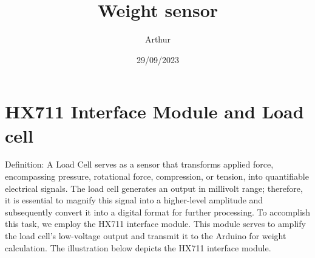 \documentclass{article}
\title{Weight sensor}
\date{29/09/2023}
\author{Arthur}
\begin{document}
\maketitle
\section*{HX711 Interface Module and Load cell}

Definition: A Load Cell serves as a sensor that transforms applied force, encompassing pressure, rotational force, compression, or tension, into quantifiable electrical signals.
The load cell generates an output in millivolt range; therefore, it is essential to magnify this signal into a higher-level amplitude and subsequently convert it into a digital format for further processing.
To accomplish this task, we employ the HX711 interface module. This module serves to amplify the load cell's low-voltage output and transmit it to the Arduino for weight calculation. 
The illustration below depicts the HX711 interface module.
\end{document}
